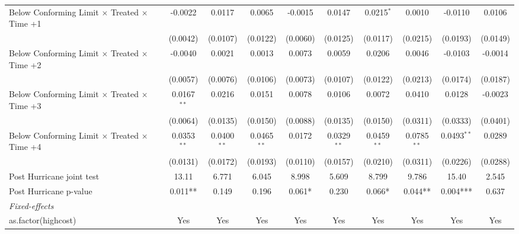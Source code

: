 \begin{tabular}{lccccccccc}
   Below Conforming Limit $\times$ Treated $\times$ Time +1   & -0.0022         & 0.0117         & 0.0065        & -0.0015   & 0.0147        & 0.0215$^{*}$  & 0.0010        & -0.0110       & 0.0106\\   
                                                              & (0.0042)        & (0.0107)       & (0.0122)      & (0.0060)  & (0.0125)      & (0.0117)      & (0.0215)      & (0.0193)      & (0.0149)\\   
   Below Conforming Limit $\times$ Treated $\times$ Time +2   & -0.0040         & 0.0021         & 0.0013        & 0.0073    & 0.0059        & 0.0206        & 0.0046        & -0.0103       & -0.0014\\   
                                                              & (0.0057)        & (0.0076)       & (0.0106)      & (0.0073)  & (0.0107)      & (0.0122)      & (0.0213)      & (0.0174)      & (0.0187)\\   
   Below Conforming Limit $\times$ Treated $\times$ Time +3   & 0.0167$^{**}$   & 0.0216         & 0.0151        & 0.0078    & 0.0106        & 0.0072        & 0.0410        & 0.0128        & -0.0023\\   
                                                              & (0.0064)        & (0.0135)       & (0.0150)      & (0.0088)  & (0.0135)      & (0.0150)      & (0.0311)      & (0.0333)      & (0.0401)\\   
   Below Conforming Limit $\times$ Treated $\times$ Time +4   & 0.0353$^{**}$   & 0.0400$^{**}$  & 0.0465$^{**}$ & 0.0172    & 0.0329$^{**}$ & 0.0459$^{**}$ & 0.0785$^{**}$ & 0.0493$^{**}$ & 0.0289\\   
                                                              & (0.0131)        & (0.0172)       & (0.0193)      & (0.0110)  & (0.0157)      & (0.0210)      & (0.0311)      & (0.0226)      & (0.0288)\\   
   Post Hurricane joint test                                  & 13.11           & 6.771          & 6.045         & 8.998     & 5.609         & 8.799         & 9.786         & 15.40         & 2.545\\  
   Post Hurricane p-value                                     & 0.011**         & 0.149          & 0.196         & 0.061*    & 0.230         & 0.066*        & 0.044**       & 0.004***      & 0.637\\  
   \midrule
   \emph{Fixed-effects}\\
   as.factor(highcost)                                        & Yes             & Yes            & Yes           & Yes       & Yes           & Yes           & Yes           & Yes           & Yes\\  

\end{tabular}
